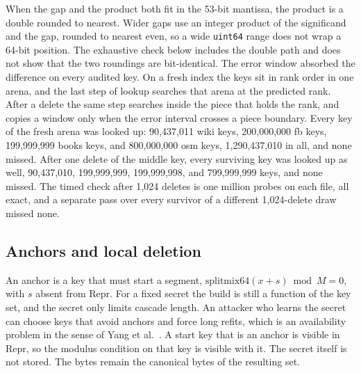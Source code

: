 \documentclass[conference]{IEEEtran}
\begin{document}
When the gap and the product both fit in the 53-bit mantissa, the product is a double rounded to nearest.
Wider gaps use an integer product of the significand and the gap, rounded to nearest even, so a wide \texttt{uint64} range does not wrap a 64-bit position.
The exhaustive check below includes the double path and does not show that the two roundings are bit-identical.
The error window absorbed the difference on every audited key.
On a fresh index the keys sit in rank order in one arena, and the last step of lookup searches that arena at the predicted rank.
After a delete the same step searches inside the piece that holds the rank, and copies a window only when the error interval crosses a piece boundary.
Every key of the fresh arena was looked up: 90{,}437{,}011 wiki keys, 200{,}000{,}000 fb keys, 199{,}999{,}999 books keys, and 800{,}000{,}000 osm keys, 1{,}290{,}437{,}010 in all, and none missed.
After one delete of the middle key, every surviving key was looked up as well, 90{,}437{,}010, 199{,}999{,}999, 199{,}999{,}998, and 799{,}999{,}999 keys, and none missed.
The timed check after 1{,}024 deletes is one million probes on each file, all exact, and a separate pass over every survivor of a different 1{,}024-delete draw missed none.

\subsection{Anchors and local deletion}

An anchor is a key that must start a segment, $\mathrm{splitmix64}(x+s)\bmod M=0$, with $s$ absent from $\mathrm{Repr}$.
For a fixed secret the build is still a function of the key set, and the secret only limits cascade length.
An attacker who learns the secret can choose keys that avoid anchors and force long refits, which is an availability problem in the sense of Yang et al.~\cite{yang2024}.
A start key that is an anchor is visible in $\mathrm{Repr}$, so the modulus condition on that key is visible with it.
The secret itself is not stored.
The bytes remain the canonical bytes of the resulting set.
\end{document}
